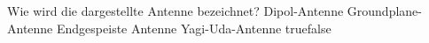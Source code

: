     {Wie wird die dargestellte Antenne bezeichnet?}
    {Dipol-Antenne}
    {Groundplane-Antenne}
    {Endgespeiste Antenne}
    {Yagi-Uda-Antenne}
    {true}{false}